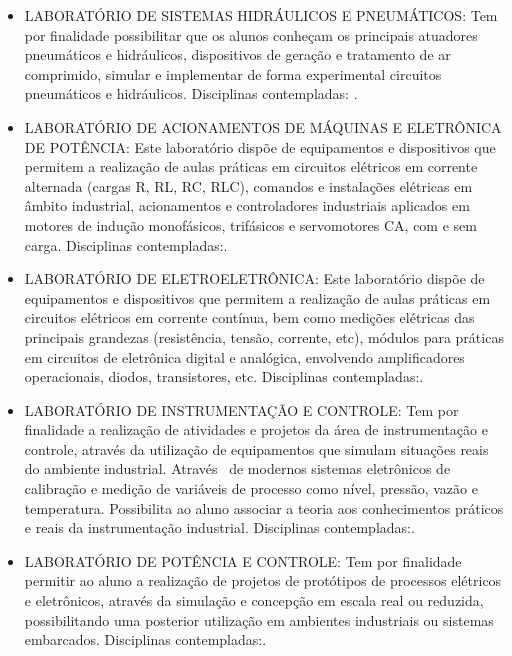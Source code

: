 \documentclass{paper}
\begin{document}
\begin{itemize}
\item [LSHIP] LABORATÓRIO DE SISTEMAS HIDRÁULICOS E PNEUMÁTICOS: Tem por finalidade possibilitar que os alunos conheçam os principais
atuadores pneumáticos e hidráulicos, dispositivos de geração e tratamento de ar comprimido, simular e implementar de
forma experimental circuitos pneumáticos e hidráulicos. Disciplinas contempladas: \LSHIPdisc.

\item [LAMEP] LABORATÓRIO DE ACIONAMENTOS DE MÁQUINAS E ELETRÔNICA DE POTÊNCIA: Este laboratório dispõe de equipamentos e dispositivos
que permitem a realização de aulas práticas em circuitos elétricos em corrente alternada (cargas R, RL, RC, RLC),
comandos e instalações elétricas em âmbito industrial, acionamentos e controladores industriais aplicados em motores de
indução monofásicos, trifásicos e servomotores CA, com e sem carga. Disciplinas contempladas:\LAMEPdisc.

\item [LEE] LABORATÓRIO DE ELETROELETRÔNICA: Este laboratório dispõe de equipamentos e dispositivos que permitem a realização de aulas práticas em circuitos elétricos em corrente contínua, bem como medições elétricas das principais grandezas (resistência, tensão, corrente, etc), módulos para práticas em circuitos de eletrônica digital e analógica, envolvendo amplificadores operacionais, diodos, transistores, etc. Disciplinas contempladas:\LEEdisc.

\item [LINC] LABORATÓRIO DE INSTRUMENTAÇÃO E CONTROLE: Tem por finalidade a realização de atividades e projetos da área de instrumentação e controle, através da utilização de equipamentos que simulam situações reais do ambiente industrial. Através~ de modernos sistemas eletrônicos de calibração e medição de variáveis de processo como nível, pressão, vazão e temperatura. Possibilita ao aluno associar a teoria aos conhecimentos práticos e reais da instrumentação industrial.
Disciplinas contempladas:\LINCdisc.


\item [LPC] LABORATÓRIO DE POTÊNCIA E CONTROLE: Tem por finalidade permitir ao aluno a realização de projetos de protótipos de processos elétricos e eletrônicos, através da simulação e concepção em escala real ou reduzida, possibilitando uma posterior utilização em ambientes industriais ou sistemas embarcados.
    Disciplinas contempladas:\LPCdisc.


\end{itemize}
\end{document}
